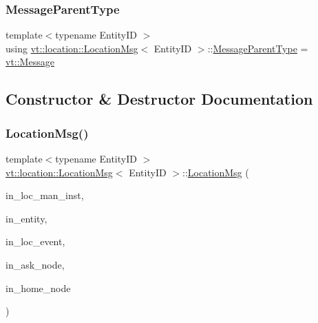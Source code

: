 \subsubsection{\texorpdfstring{Message\+Parent\+Type}{MessageParentType}}
{\footnotesize\ttfamily template$<$typename Entity\+ID $>$ \\
using \hyperlink{structvt_1_1location_1_1_location_msg}{vt\+::location\+::\+Location\+Msg}$<$ Entity\+ID $>$\+::\hyperlink{structvt_1_1messaging_1_1_active_msg_ac2e6d93267991027ce78c968b17064c7}{Message\+Parent\+Type} =  \hyperlink{namespacevt_a3a3ddfef40b4c90915fa43cdd5f129ea}{vt\+::\+Message}}



\subsection{Constructor \& Destructor Documentation}
\mbox{\label{structvt_1_1location_1_1_location_msg_af1b76aa81c81ed8ed2a9c9db4e5cff45}} 
\subsubsection{\texorpdfstring{Location\+Msg()}{LocationMsg()}}
{\footnotesize\ttfamily template$<$typename Entity\+ID $>$ \\
\hyperlink{structvt_1_1location_1_1_location_msg}{vt\+::location\+::\+Location\+Msg}$<$ Entity\+ID $>$\+::\hyperlink{structvt_1_1location_1_1_location_msg}{Location\+Msg} (\begin{DoxyParamCaption}\item[{\hyperlink{namespacevt_1_1location_a4db6456e8024af2d23fc5ae560fef866}{Loc\+Inst\+Type} const \&}]{in\+\_\+loc\+\_\+man\+\_\+inst,  }\item[{Entity\+ID const \&}]{in\+\_\+entity,  }\item[{\hyperlink{namespacevt_1_1location_aa5ccc1a42aa22b0b41fcfbbdee314dca}{Loc\+Event\+ID} const \&}]{in\+\_\+loc\+\_\+event,  }\item[{\hyperlink{namespacevt_a866da9d0efc19c0a1ce79e9e492f47e2}{Node\+Type} const \&}]{in\+\_\+ask\+\_\+node,  }\item[{\hyperlink{namespacevt_a866da9d0efc19c0a1ce79e9e492f47e2}{Node\+Type}}]{in\+\_\+home\+\_\+node }\end{DoxyParamCaption})\hspace{0.3cm}{\ttfamily [inline]}}




